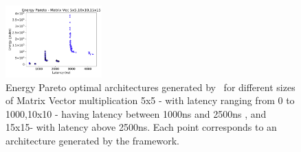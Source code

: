 \begin{figure}[!h]
\centering
\includegraphics[width=0.33\textwidth]{graphs/EnergyParetoPlotMultipleSizeMAtrixVec_v3.pdf}
    \caption{\small Energy Pareto optimal architectures generated by \frameworkname ~for different sizes of Matrix Vector multiplication 5x5 - with latency ranging from 0 to 1000,10x10 - having latency between 1000ns and 2500ns , and 15x15- with latency above 2500ns. Each point corresponds to an architecture generated by the framework.}
\label{fig:sram_vs_mram_pareto_vec_sizes}
\end{figure}
